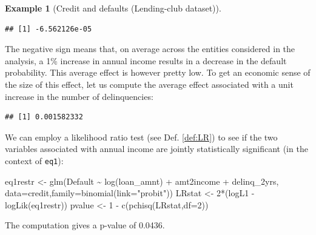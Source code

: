 \documentclass[
  12pt,
]{book}
\newenvironment{Shaded}{\begin{snugshade}}{\end{snugshade}}
\newcommand{\AttributeTok}[1]{\textcolor[rgb]{0.77,0.63,0.00}{#1}}
\newcommand{\DecValTok}[1]{\textcolor[rgb]{0.00,0.00,0.81}{#1}}
\newcommand{\FunctionTok}[1]{\textcolor[rgb]{0.00,0.00,0.00}{#1}}
\newcommand{\NormalTok}[1]{#1}
\newcommand{\OtherTok}[1]{\textcolor[rgb]{0.56,0.35,0.01}{#1}}
\newcommand{\SpecialCharTok}[1]{\textcolor[rgb]{0.00,0.00,0.00}{#1}}
\newcommand{\StringTok}[1]{\textcolor[rgb]{0.31,0.60,0.02}{#1}}
\theoremstyle{definition}
\theoremstyle{definition}
\newtheorem{example}{Example}[chapter]
\theoremstyle{definition}
\theoremstyle{definition}
\theoremstyle{remark}
\begin{document}
\begin{example}[Credit and defaults (Lending-club dataset)]
\begin{verbatim}
## [1] -6.562126e-05
\end{verbatim}

The negative sign means that, on average across the entities considered in the analysis, a 1\% increase in annual income results in a decrease in the default probability. This average effect is however pretty low. To get an economic sense of the size of this effect, let us compute the average effect associated with a unit increase in the number of delinquencies:

\begin{Shaded}
\end{Shaded}

\begin{verbatim}
## [1] 0.001582332
\end{verbatim}

We can employ a likelihood ratio test (see Def. \ref{def:LR}) to see if the two variables associated with annual income are jointly statistically significant (in the context of \texttt{eq1}):

\begin{Shaded}
\begin{Highlighting}[]
\NormalTok{eq1restr }\OtherTok{\textless{}{-}} \FunctionTok{glm}\NormalTok{(Default }\SpecialCharTok{\textasciitilde{}} \FunctionTok{log}\NormalTok{(loan\_amnt) }\SpecialCharTok{+}\NormalTok{ amt2income }\SpecialCharTok{+}\NormalTok{ delinq\_2yrs,}
                \AttributeTok{data=}\NormalTok{credit,}\AttributeTok{family=}\FunctionTok{binomial}\NormalTok{(}\AttributeTok{link=}\StringTok{"probit"}\NormalTok{))}
\NormalTok{LRstat }\OtherTok{\textless{}{-}} \DecValTok{2}\SpecialCharTok{*}\NormalTok{(logL1 }\SpecialCharTok{{-}} \FunctionTok{logLik}\NormalTok{(eq1restr))}
\NormalTok{pvalue }\OtherTok{\textless{}{-}} \DecValTok{1} \SpecialCharTok{{-}} \FunctionTok{c}\NormalTok{(}\FunctionTok{pchisq}\NormalTok{(LRstat,}\AttributeTok{df=}\DecValTok{2}\NormalTok{))}
\end{Highlighting}
\end{Shaded}

The computation gives a p-value of 0.0436.
\end{example}
\end{document}

